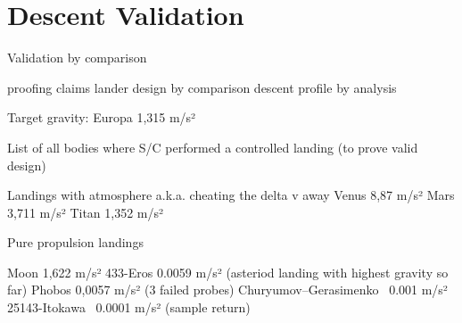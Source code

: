 \section{Descent Validation}

Validation by comparison 

proofing claims
	lander design by comparison
	descent profile by analysis



Target gravity: Europa 1,315 m/s²

List of all bodies where S/C performed a controlled landing (to prove valid design)

	Landings with atmosphere a.k.a. cheating the  delta v away
		Venus 8,87 m/s²
		Mars 3,711 m/s²
		Titan 1,352 m/s²

	Pure propulsion landings

		Moon 1,622 m/s²
		433-Eros 0.0059 m/s² (asteriod landing with highest gravity so far)
		Phobos 0,0057 m/s² (3 failed probes)
		Churyumov–Gerasimenko ~0.001 m/s²
		25143-Itokawa ~0.0001 m/s² (sample return)
